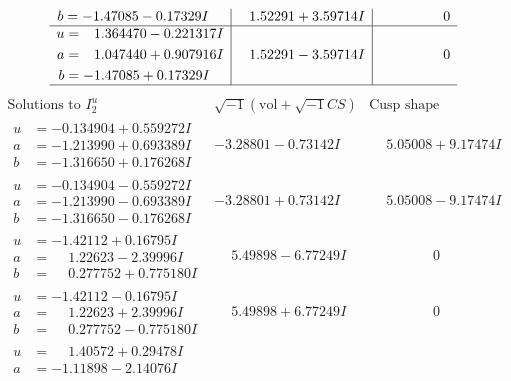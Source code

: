 \documentclass[1p]{elsarticle_modified}
\theoremstyle{definition}
\newcommand{\I}{\sqrt{-1}}
\begin{document}
$$\begin{array}{c|c|c}
\begin{aligned}
b &= -1.47085 - 0.17329 I\end{aligned}
 & \phantom{-}1.52291 + 3.59714 I & \phantom{-0.000000 } 0 \\ \hline\begin{aligned}
u &= \phantom{-}1.364470 - 0.221317 I \\
a &= \phantom{-}1.047440 + 0.907916 I \\
b &= -1.47085 + 0.17329 I\end{aligned}
 & \phantom{-}1.52291 - 3.59714 I & \phantom{-0.000000 } 0\\
 \hline 
 \end{array}$$\newpage$$\begin{array}{c|c|c}  
\text{Solutions to }I^u_{2}& \I (\text{vol} + \sqrt{-1}CS) & \text{Cusp shape}\\
 \hline 
\begin{aligned}
u &= -0.134904 + 0.559272 I \\
a &= -1.213990 + 0.693389 I \\
b &= -1.316650 + 0.176268 I\end{aligned}
 & -3.28801 - 0.73142 I & \phantom{-}5.05008 + 9.17474 I \\ \hline\begin{aligned}
u &= -0.134904 - 0.559272 I \\
a &= -1.213990 - 0.693389 I \\
b &= -1.316650 - 0.176268 I\end{aligned}
 & -3.28801 + 0.73142 I & \phantom{-}5.05008 - 9.17474 I \\ \hline\begin{aligned}
u &= -1.42112 + 0.16795 I \\
a &= \phantom{-}1.22623 - 2.39996 I \\
b &= \phantom{-}0.277752 + 0.775180 I\end{aligned}
 & \phantom{-}5.49898 - 6.77249 I & \phantom{-0.000000 } 0 \\ \hline\begin{aligned}
u &= -1.42112 - 0.16795 I \\
a &= \phantom{-}1.22623 + 2.39996 I \\
b &= \phantom{-}0.277752 - 0.775180 I\end{aligned}
 & \phantom{-}5.49898 + 6.77249 I & \phantom{-0.000000 } 0 \\ \hline\begin{aligned}
u &= \phantom{-}1.40572 + 0.29478 I \\
a &= -1.11898 - 2.14076 I \\

\end{aligned}
\end{array}$$
\end{document}
